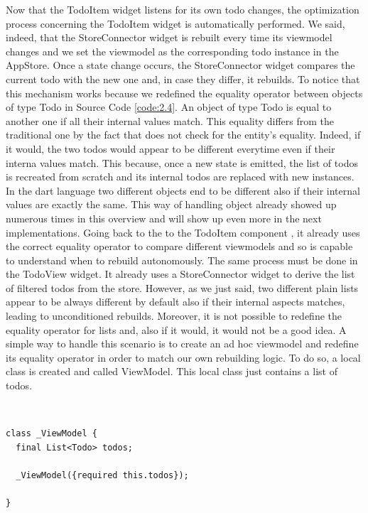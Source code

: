 Now that the TodoItem widget listens for its own todo changes, the optimization process concerning the TodoItem widget is automatically performed. We said, indeed, that the StoreConnector widget is rebuilt every time its viewmodel changes and we set the viewmodel as the corresponding todo instance in the AppStore. Once a state change occurs, the StoreConnector widget compares the current todo with the new one and, in case they differ, it rebuilds. To notice that this mechanism works because we redefined the equality operator between objects of type Todo in Source Code \ref{code:2.4}. An object of type Todo is equal to another one if all their internal values match. This equality differs from the traditional one by the fact that does not check for the entity’s equality. Indeed, if it would, the two todos would appear to be different everytime even if their interna values match. This because, once a new state is emitted, the list of todos is recreated from scratch and its internal todos are replaced with new instances. In the dart language two different objects end to be different also if their internal values are exactly the same. This way of handling object already showed up numerous times in this overview and will show up even more in the next implementations. Going back to the to the TodoItem component , it already uses the correct equality operator to compare different viewmodels and so is capable to understand when to rebuild autonomously. The same process must be done in the TodoView widget. It already uses a StoreConnector widget to derive the list of filtered todos from the store. However, as we just said, two different plain lists appear to be always different by default also if their internal aspects matches, leading to unconditioned rebuilds. Moreover, it is not possible to redefine the equality operator for lists and, also if it would, it would not be a good idea. A simple way to handle this scenario is to create an ad hoc viewmodel and redefine its equality operator in order to match our own rebuilding logic. To do so, a local class is created and called ViewModel. This local class just contains a list of todos.
\begin{code}
\mbox{}\\
 \mbox{}
		\label{code:2.14}
\begin{verbatim}
class _ViewModel {
  final List<Todo> todos;

  _ViewModel({required this.todos});

}
\end{verbatim}
\mbox{}
\end{code}

